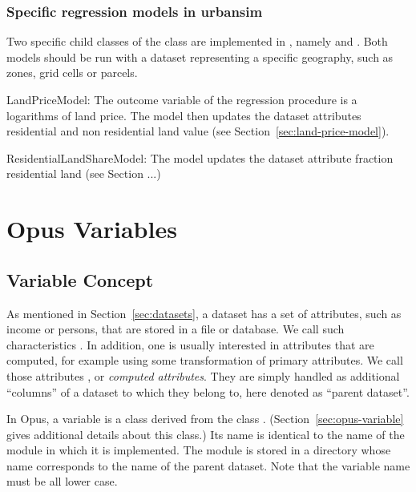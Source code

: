 %
\subsubsection{Specific regression models in urbansim}
%
Two specific child classes of the  class are implemented in
,  namely  and .
Both models should
be run with a dataset \datasetindex representing a
specific geography, such as zones, grid cells or parcels.
\begin{description}
\item{LandPriceModel}: The outcome variable \variablesindex of
the regression procedure is a logarithms of land price. The model then updates
the dataset \datasetindex attributes residential and non residential land value
(see Section~\ref{sec:land-price-model}).
\item{ResidentialLandShareModel}: The model updates the dataset \datasetindex attribute
fraction residential land (see Section ...)

\end{description}

%
\section{Opus Variables} 
%
\label{sec:variables}
%
\subsection{Variable Concept}
%
\label{sec:variableconcept}
%
\variablesindex

As mentioned in Section~\ref{sec:datasets}, a dataset \datasetindex has a set of
attributes, \attributesindex such as income or persons, that are stored in a file or database.
We call such characteristics . \primaryattributesindex In addition, one is usually
interested in attributes \attributesindex that are computed, for example using some
transformation of primary attributes. \primaryattributesindex We call those attributes , \variablesindex or {\it computed attributes}. \computedattributesindex They are simply handled as additional
``columns'' of a dataset \datasetindex to which they belong to, here denoted as
``parent dataset''. \datasetindex

In Opus, a variable \variablesindex is a class derived from the
 class  \variablesindex.
(Section~\ref{sec:opus-variable} gives additional details about this class.)
Its name is identical to the name of the module in which it is implemented.
The module is stored in a directory whose name corresponds to the name of
the parent dataset. \datasetindex Note that the variable \variablesindex 
name must be all lower case.

